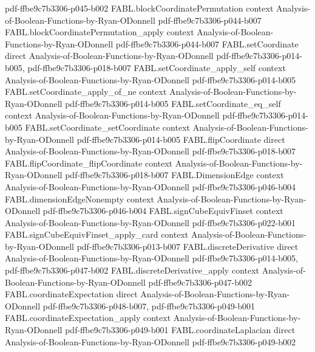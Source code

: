 \begin{theorem}
  {pdf-ffbe9c7b3306-p045-b002}
\proofstep
  {FABL.blockCoordinatePermutation}
  {context}
  {Analysis-of-Boolean-Functions-by-Ryan-ODonnell}
  {pdf-ffbe9c7b3306-p044-b007}
\proofstep
  {FABL.blockCoordinatePermutation_apply}
  {context}
  {Analysis-of-Boolean-Functions-by-Ryan-ODonnell}
  {pdf-ffbe9c7b3306-p044-b007}
\proofstep
  {FABL.setCoordinate}
  {direct}
  {Analysis-of-Boolean-Functions-by-Ryan-ODonnell}
  {pdf-ffbe9c7b3306-p014-b005,
    pdf-ffbe9c7b3306-p018-b007}
\proofstep
  {FABL.setCoordinate_apply_self}
  {context}
  {Analysis-of-Boolean-Functions-by-Ryan-ODonnell}
  {pdf-ffbe9c7b3306-p014-b005}
\proofstep
  {FABL.setCoordinate_apply_of_ne}
  {context}
  {Analysis-of-Boolean-Functions-by-Ryan-ODonnell}
  {pdf-ffbe9c7b3306-p014-b005}
\proofstep
  {FABL.setCoordinate_eq_self}
  {context}
  {Analysis-of-Boolean-Functions-by-Ryan-ODonnell}
  {pdf-ffbe9c7b3306-p014-b005}
\proofstep
  {FABL.setCoordinate_setCoordinate}
  {context}
  {Analysis-of-Boolean-Functions-by-Ryan-ODonnell}
  {pdf-ffbe9c7b3306-p014-b005}
\proofstep
  {FABL.flipCoordinate}
  {direct}
  {Analysis-of-Boolean-Functions-by-Ryan-ODonnell}
  {pdf-ffbe9c7b3306-p018-b007}
\proofstep
  {FABL.flipCoordinate_flipCoordinate}
  {context}
  {Analysis-of-Boolean-Functions-by-Ryan-ODonnell}
  {pdf-ffbe9c7b3306-p018-b007}
\proofstep
  {FABL.DimensionEdge}
  {context}
  {Analysis-of-Boolean-Functions-by-Ryan-ODonnell}
  {pdf-ffbe9c7b3306-p046-b004}
\proofstep
  {FABL.dimensionEdgeNonempty}
  {context}
  {Analysis-of-Boolean-Functions-by-Ryan-ODonnell}
  {pdf-ffbe9c7b3306-p046-b004}
\proofstep
  {FABL.signCubeEquivFinset}
  {context}
  {Analysis-of-Boolean-Functions-by-Ryan-ODonnell}
  {pdf-ffbe9c7b3306-p022-b001}
\proofstep
  {FABL.signCubeEquivFinset_apply_card}
  {context}
  {Analysis-of-Boolean-Functions-by-Ryan-ODonnell}
  {pdf-ffbe9c7b3306-p013-b007}
\proofstep
  {FABL.discreteDerivative}
  {direct}
  {Analysis-of-Boolean-Functions-by-Ryan-ODonnell}
  {pdf-ffbe9c7b3306-p014-b005,
    pdf-ffbe9c7b3306-p047-b002}
\proofstep
  {FABL.discreteDerivative_apply}
  {context}
  {Analysis-of-Boolean-Functions-by-Ryan-ODonnell}
  {pdf-ffbe9c7b3306-p047-b002}
\proofstep
  {FABL.coordinateExpectation}
  {direct}
  {Analysis-of-Boolean-Functions-by-Ryan-ODonnell}
  {pdf-ffbe9c7b3306-p048-b007,
    pdf-ffbe9c7b3306-p049-b001}
\proofstep
  {FABL.coordinateExpectation_apply}
  {context}
  {Analysis-of-Boolean-Functions-by-Ryan-ODonnell}
  {pdf-ffbe9c7b3306-p049-b001}
\proofstep
  {FABL.coordinateLaplacian}
  {direct}
  {Analysis-of-Boolean-Functions-by-Ryan-ODonnell}
  {pdf-ffbe9c7b3306-p049-b002}
\proofstep

\end{theorem}

